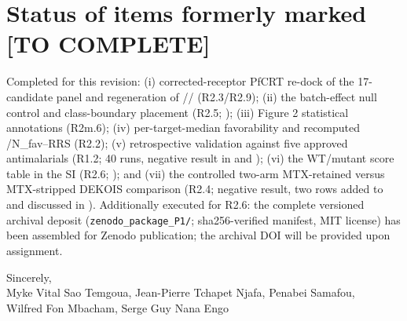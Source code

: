 \documentclass[11pt]{article}
\begin{document}
\section*{Status of items formerly marked [TO COMPLETE]}
Completed for this revision: (i) corrected-receptor PfCRT re-dock of the 17-candidate panel
and regeneration of // (R2.3/R2.9); (ii) the batch-effect null
control and class-boundary placement (R2.5; ); (iii) Figure 2 statistical
annotations (R2m.6); (iv) per-target-median favorability and recomputed
/N\_fav--RRS (R2.2); (v) retrospective validation against five approved
antimalarials (R1.2; 40 runs, negative result in  and
); (vi) the WT/mutant score table in the SI (R2.6;
); and (vii) the controlled two-arm MTX-retained versus
MTX-stripped DEKOIS comparison (R2.4; negative result, two rows added to
 and discussed in ).
Additionally executed for R2.6: the complete versioned archival deposit (\texttt{zenodo\_package\_P1/};
sha256-verified manifest, MIT license) has been assembled for Zenodo publication; the archival
DOI will be provided upon assignment.

\vspace{2em}
\noindent Sincerely,\\
Myke Vital Sao Temgoua, Jean-Pierre Tchapet Njafa, Penabei Samafou,\\
Wilfred Fon Mbacham, Serge Guy Nana Engo
\end{document}
